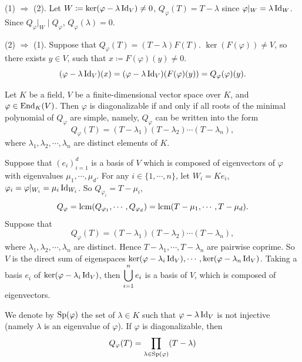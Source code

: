 \begin{proofenv}
    (1) $\Rightarrow$ (2). Let $W \coloneq \ker(\varphi - \lambda \operatorname{\mathrm{Id}}_{V}) \neq 0$,
    $Q_{\varphi}(T) = T - \lambda$ since $\varphi|_{W} = \lambda \operatorname{\mathrm{Id}}_{W}$.
    Since $Q_{\varphi}|_{W} \mid Q_{\varphi}$, $Q_{\varphi}(\lambda) = 0$.

    \quad
    (2) $\Rightarrow$ (1). Suppose that $Q_{\varphi}(T) = (T - \lambda)F(T)$.
    $\ker(F(\varphi)) \neq V$, so there exists $y \in V$, such that $x \coloneq F(\varphi)(y) \neq 0$.
    $$(\varphi - \lambda \operatorname{\mathrm{Id}}_{V})(x) = (\varphi - \lambda \operatorname{\mathrm{Id}}_{V})(F(\varphi)(y)) = Q_{\varphi}(\varphi)(y).$$
\end{proofenv}

\begin{theoremenv}
    Let $K$ be a field, $V$ be a finite-dimensional vector space over $K$,
    and $\varphi \in \operatorname{\mathrm{End}}_{K}(V)$.
    Then $\varphi$ is diagonalizable if and only if all roots of the minimal polynomial of $Q_\varphi$ are simple,
    namely, $Q_{\varphi}$ can be written into the form
    $$Q_{\varphi}(T) = (T - \lambda_1)(T - \lambda_2)\cdots(T - \lambda_n),$$
    where $\lambda_1, \lambda_2, \cdots, \lambda_n$ are distinct elements of $K$.
\end{theoremenv}
\begin{proofenv}
    Suppose that $(e_i)_{i=1}^d$ is a basis of $V$ which is composed of eigenvectors of $\varphi$ with eigenvalues $\mu_1,\cdots,\mu_d$.
    For any $i \in \{1,\cdots,n\}$, let $W_i = K e_i$, $\varphi_i = \varphi|_{W_i} = \mu_i \operatorname{\mathrm{Id}}_{W_i}$.
    So $Q_{\varphi_i} = T - \mu_i$,
    $$Q_{\varphi} = \operatorname{\mathrm{lcm}}(Q_{\varphi_1}, \cdots, Q_{\varphi_d}) = \operatorname{\mathrm{lcm}}(T-\mu_1, \cdots, T-\mu_d).$$
    Suppose that
    $$Q_{\varphi}(T) = (T - \lambda_1)(T - \lambda_2)\cdots(T - \lambda_n),$$
    where $\lambda_1, \lambda_2, \cdots, \lambda_n$ are distinct.
    Hence $T-\lambda_1,\cdots,T-\lambda_n$ are pairwise coprime.
    So $V$ is the direct sum of eigenspaces $\ker(\varphi - \lambda_i \operatorname{\mathrm{Id}}_{V}),\cdots,\ker(\varphi - \lambda_n \operatorname{\mathrm{Id}}_{V})$.
    Taking a basis $e_i$ of $\ker(\varphi - \lambda_i \operatorname{\mathrm{Id}}_{V})$,
    then $\displaystyle \bigcup_{i=1}^{n}e_i$ is a basis of $V$,
    which is composed of eigenvectors.
\end{proofenv}

\begin{remark}
    We denote by $\operatorname{\mathrm{Sp}}(\varphi)$ the set of $\lambda \in K$ such that $\varphi - \lambda \operatorname{\mathrm{Id}}_{V}$ is not injective (namely $\lambda$ is an eigenvalue of $\varphi$).
    If $\varphi$ is diagonalizable, then
    $$Q_{\varphi} (T) = \prod_{\lambda \in \operatorname{\mathrm{Sp}}(\varphi)} (T - \lambda)$$
\end{remark}


